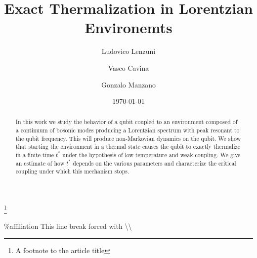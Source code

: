 \documentclass[%
 reprint,
 amsmath,amssymb,
 aps,
]{revtex4-2}
\begin{document}

\title{Exact Thermalization in Lorentzian Environemts}%
\thanks{A footnote to the article title}%

\author{Ludovico Lenzuni}
\author{Vasco Cavina}%
%


\author{Gonzalo Manzano}
%
\%affiliation{%
 This line break forced with \textbackslash\textbackslash
}%


\date{\today}%

\begin{abstract}
In this work we study the behavior of a qubit coupled to an environment composed of a continuum of bosonic modes producing a Lorentzian spectrum with peak resonant to the qubit frequency. This will produce non-Markovian dynamics on the qubit. We show that starting the environment in a thermal state causes the qubit to exactly thermalize in a finite time $t^*$ under the hypothesis of low temperature and weak coupling. We give an estimate of how $t^*$ depends on the various parameters and characterize the critical coupling under which this mechanism stops. 
\end{abstract}

\maketitle
\end{document}
